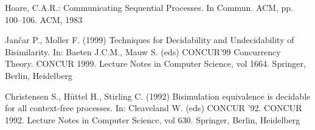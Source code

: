 \begin{thebibliography}{8}
  Hoare, C.A.R.: Communicating Sequential Processes. In Commun. ACM, pp. 100--106. ACM, 1983

  Jančar P., Moller F. (1999) Techniques for Decidability and Undecidability of Bisimilarity. In: Baeten J.C.M., Mauw S. (eds) CONCUR’99 Concurrency Theory. CONCUR 1999. Lecture Notes in Computer Science, vol 1664. Springer, Berlin, Heidelberg

  Christensen S., Hüttel H., Stirling C. (1992) Bisimulation equivalence is decidable for all context-free processes. In: Cleaveland W. (eds) CONCUR '92. CONCUR 1992. Lecture Notes in Computer Science, vol 630. Springer, Berlin, Heidelberg

  


\end{thebibliography}


